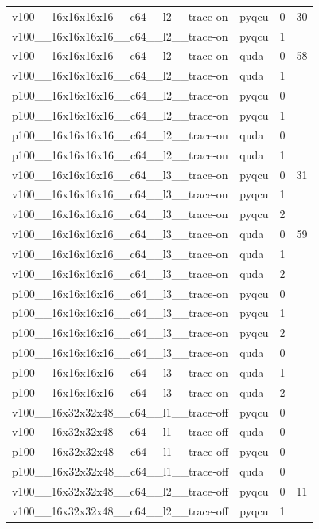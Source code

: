 \begin{table}[htbp]
\begin{tabular}{@{}llrr@{}}
v100\_\_16x16x16x16\_\_c64\_\_l2\_\_trace-on & pyqcu & 0 & 30 \\
v100\_\_16x16x16x16\_\_c64\_\_l2\_\_trace-on & pyqcu & 1 &  \\
v100\_\_16x16x16x16\_\_c64\_\_l2\_\_trace-on & quda & 0 & 58 \\
v100\_\_16x16x16x16\_\_c64\_\_l2\_\_trace-on & quda & 1 &  \\
p100\_\_16x16x16x16\_\_c64\_\_l2\_\_trace-on & pyqcu & 0 &  \\
p100\_\_16x16x16x16\_\_c64\_\_l2\_\_trace-on & pyqcu & 1 &  \\
p100\_\_16x16x16x16\_\_c64\_\_l2\_\_trace-on & quda & 0 &  \\
p100\_\_16x16x16x16\_\_c64\_\_l2\_\_trace-on & quda & 1 &  \\
v100\_\_16x16x16x16\_\_c64\_\_l3\_\_trace-on & pyqcu & 0 & 31 \\
v100\_\_16x16x16x16\_\_c64\_\_l3\_\_trace-on & pyqcu & 1 &  \\
v100\_\_16x16x16x16\_\_c64\_\_l3\_\_trace-on & pyqcu & 2 &  \\
v100\_\_16x16x16x16\_\_c64\_\_l3\_\_trace-on & quda & 0 & 59 \\
v100\_\_16x16x16x16\_\_c64\_\_l3\_\_trace-on & quda & 1 &  \\
v100\_\_16x16x16x16\_\_c64\_\_l3\_\_trace-on & quda & 2 &  \\
p100\_\_16x16x16x16\_\_c64\_\_l3\_\_trace-on & pyqcu & 0 &  \\
p100\_\_16x16x16x16\_\_c64\_\_l3\_\_trace-on & pyqcu & 1 &  \\
p100\_\_16x16x16x16\_\_c64\_\_l3\_\_trace-on & pyqcu & 2 &  \\
p100\_\_16x16x16x16\_\_c64\_\_l3\_\_trace-on & quda & 0 &  \\
p100\_\_16x16x16x16\_\_c64\_\_l3\_\_trace-on & quda & 1 &  \\
p100\_\_16x16x16x16\_\_c64\_\_l3\_\_trace-on & quda & 2 &  \\
v100\_\_16x32x32x48\_\_c64\_\_l1\_\_trace-off & pyqcu & 0 &  \\
v100\_\_16x32x32x48\_\_c64\_\_l1\_\_trace-off & quda & 0 &  \\
p100\_\_16x32x32x48\_\_c64\_\_l1\_\_trace-off & pyqcu & 0 &  \\
p100\_\_16x32x32x48\_\_c64\_\_l1\_\_trace-off & quda & 0 &  \\
v100\_\_16x32x32x48\_\_c64\_\_l2\_\_trace-off & pyqcu & 0 & 11 \\
v100\_\_16x32x32x48\_\_c64\_\_l2\_\_trace-off & pyqcu & 1 &  \\

\end{tabular}
\end{table}
